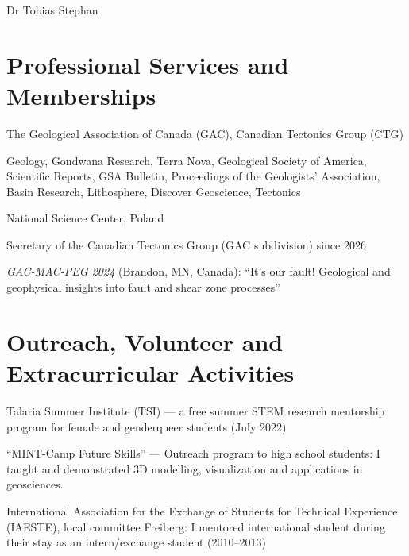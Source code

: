\documentclass[10pt, paper=letter]{scrartcl} %
\begin{document}
\begin{cv}{\textcolor{myred}{\textsf{Dr Tobias Stephan}}}
    \section{Professional Services and Memberships}
    \begin{cvlist}{}
        \item[Memberships] The Geological Association of Canada (GAC), Canadian Tectonics
        Group (CTG)%
        \item[Reviewer for journals] Geology, Gondwana Research, Terra Nova, Geological
        Society of America, Scientific Reports, GSA Bulletin, Proceedings of the Geologists'
        Association, Basin Research, Lithosphere, Discover Geoscience, Tectonics
        \item[Reviewer for grant proposals] National Science Center, Poland
        \item[Committee board member] Secretary of the Canadian
        Tectonics Group (GAC subdivision) since 2026
        \item[Session Chair] \textit{GAC-MAC-PEG 2024} (Brandon, MN, Canada): \enquote{It's
            our fault! Geological and geophysical insights into fault and shear zone
            processes}
    \end{cvlist}

    \section{Outreach, Volunteer and Extracurricular Activities}
    \begin{cvlist}{}
        \item Talaria Summer Institute (TSI) --- a free summer STEM research mentorship
        program for female and genderqueer students (July 2022)
        \item  \enquote{MINT-Camp Future Skills} --- Outreach program to high school students: I taught and demonstrated 3D modelling, visualization and applications in geosciences.
        \item International Association for the Exchange of Students for Technical Experience
        (IAESTE), local committee Freiberg: I mentored international student during
        their stay as an intern/exchange student (2010--2013)
    \end{cvlist}


\end{cv}
\end{document}
